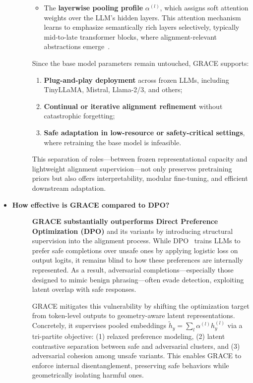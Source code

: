 \begin{itemize}[leftmargin=15pt,nolistsep]
\begin{description}
\begin{itemize}
    \item The \textbf{layerwise pooling profile} \(\alpha^{(l)}\), which assigns soft attention weights over the LLM’s hidden layers. This attention mechanism learns to emphasize semantically rich layers selectively, typically mid-to-late transformer blocks, where alignment-relevant abstractions emerge~\citep{belrose2023language, mu2023layers}.
\end{itemize}

Since the base model parameters remain untouched, GRACE supports:
\begin{enumerate}[label=(\alph*),leftmargin=1.2em]
    \item \textbf{Plug-and-play deployment} across frozen LLMs, including TinyLLaMA, Mistral, Llama-2/3, and others;
    \item \textbf{Continual or iterative alignment refinement} without catastrophic forgetting;
    \item \textbf{Safe adaptation in low-resource or safety-critical settings}, where retraining the base model is infeasible.
\end{enumerate}

This separation of roles—between frozen representational capacity and lightweight alignment supervision—not only preserves pretraining priors but also offers interpretability, modular fine-tuning, and efficient downstream adaptation.
\end{description}

\item[\ding{93}] { \selectfont \textbf{How effective is GRACE compared to DPO?}}
\begin{description}
\item[] \textbf{GRACE substantially outperforms Direct Preference Optimization (DPO)} and its variants by introducing structural supervision into the alignment process. While DPO~\citep{rafailov2023direct} trains LLMs to prefer safe completions over unsafe ones by applying logistic loss on output logits, it remains blind to how these preferences are internally represented. As a result, adversarial completions—especially those designed to mimic benign phrasing—often evade detection, exploiting latent overlap with safe responses. 

GRACE mitigates this vulnerability by shifting the optimization target from token-level outputs to geometry-aware latent representations. Concretely, it supervises pooled embeddings \(\tilde{h}_y = \sum_l \alpha^{(l)} h_y^{(l)}\) via a tri-partite objective: (1) relaxed preference modeling, (2) latent contrastive separation between safe and adversarial clusters, and (3) adversarial cohesion among unsafe variants. This enables GRACE to enforce internal disentanglement, preserving safe behaviors while geometrically isolating harmful ones.


\end{description}
\end{itemize}
